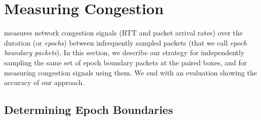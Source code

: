 \section{Measuring Congestion}\label{s:measurement}



\name measures network congestion signals (RTT and packet arrival rates) over the duration (or \emph{epochs}) between infrequently sampled packets (that we call \emph{epoch boundary packets}). In this section, we describe our strategy for independently sampling the same set of epoch boundary packets at the paired \name boxes, and for measuring congestion signals using them. We end with an evaluation showing the accuracy of our approach.

\subsection{Determining Epoch Boundaries}
\label{s:measure:marking}


